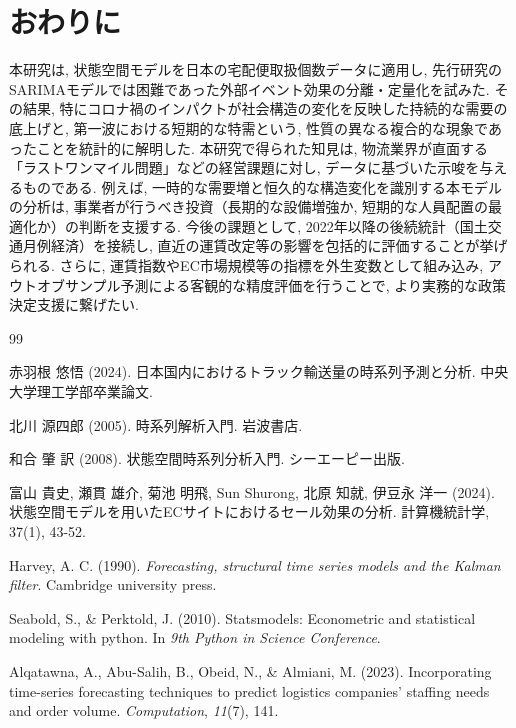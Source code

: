 \documentclass[a4paper, 10pt]{jarticle}
\begin{document}
\section{おわりに}
本研究は, 状態空間モデルを日本の宅配便取扱個数データに適用し, 先行研究のSARIMAモデルでは困難であった外部イベント効果の分離・定量化を試みた. 
その結果, 特にコロナ禍のインパクトが社会構造の変化を反映した持続的な需要の底上げと, 
第一波における短期的な特需という, 性質の異なる複合的な現象であったことを統計的に解明した. 
本研究で得られた知見は, 物流業界が直面する「ラストワンマイル問題」などの経営課題に対し, データに基づいた示唆を与えるものである. 
例えば, 一時的な需要増と恒久的な構造変化を識別する本モデルの分析は, 
事業者が行うべき投資（長期的な設備増強か, 短期的な人員配置の最適化か）の判断を支援する. 
今後の課題として, 2022年以降の後続統計（国土交通月例経済）を接続し, 直近の運賃改定等の影響を包括的に評価することが挙げられる. 
さらに, 運賃指数やEC市場規模等の指標を外生変数として組み込み, アウトオブサンプル予測による客観的な精度評価を行うことで, より実務的な政策決定支援に繋げたい.

\begin{thebibliography}{99}
  \setlength{\itemsep}{0pt}

赤羽根 悠悟 (2024). 日本国内におけるトラック輸送量の時系列予測と分析. 中央大学理工学部卒業論文.

北川 源四郎 (2005). 時系列解析入門. 岩波書店.

和合 肇 訳 (2008). 状態空間時系列分析入門. シーエーピー出版.

富山 貴史, 瀬貫 雄介, 菊池 明飛, Sun Shurong, 北原 知就, 伊豆永 洋一 (2024). 状態空間モデルを用いたECサイトにおけるセール効果の分析. 計算機統計学, 37(1), 43-52.

Harvey, A. C. (1990). \textit{Forecasting, structural time series models and the Kalman filter}. Cambridge university press.

Seabold, S., \& Perktold, J. (2010). Statsmodels: Econometric and statistical modeling with python. 
In \textit{9th Python in Science Conference}.

Alqatawna, A., Abu-Salih, B., Obeid, N., \& Almiani, M. (2023). 
Incorporating time-series forecasting techniques to predict logistics companies' staffing needs and order volume. 
\textit{Computation}, \textit{11}(7), 141.


\end{thebibliography}
\end{document}
